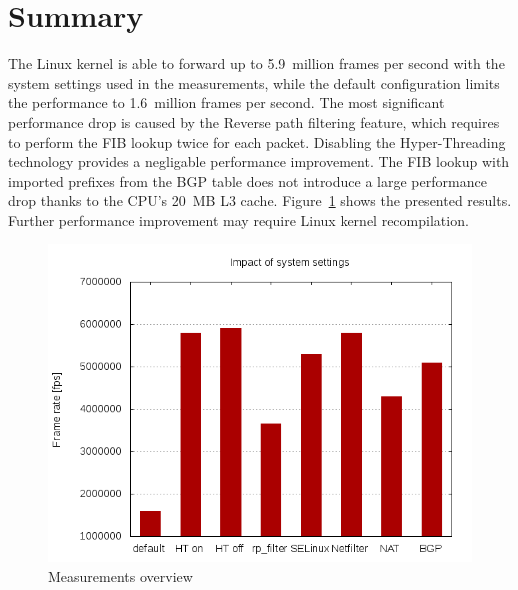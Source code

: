 \section{Summary}
The Linux kernel is able to forward up to 5.9~million frames per second
with the system settings used in the measurements,
while the default configuration limits the performance to 1.6~million frames per second.
The most significant performance drop is caused by the Reverse path filtering feature,
which requires to perform the FIB lookup twice for each packet.
Disabling the Hyper-Threading technology provides a negligable performance improvement.
The FIB lookup with imported prefixes from the BGP table does not introduce a large performance drop
thanks to the CPU's 20~MB L3 cache.
Figure~\ref{fig:measurements-overview} shows the presented results.
Further performance improvement may require Linux kernel recompilation.
	\begin{figure}[H]
		\centering
		\includegraphics[width=11.5cm,keepaspectratio]{fig/settings.png}
		\caption{Measurements overview}
		\label{fig:measurements-overview}
	\end{figure}

